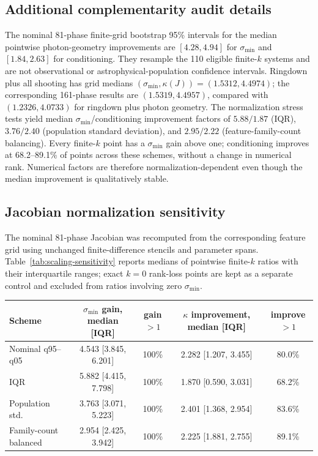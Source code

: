 \documentclass[11pt]{article}
\newcommand{\smin}{\sigma_{\min}}
\newcommand{\kappaJ}{\kappa(J)}
\begin{document}
\subsection{Additional complementarity audit details}
The nominal 81-phase finite-grid bootstrap 95\% intervals for the median
pointwise photon-geometry improvements are $[4.28,4.94]$ for $\smin$ and
$[1.84,2.63]$ for conditioning. They resample the 110 eligible finite-$k$
systems and are not observational or astrophysical-population confidence
intervals. Ringdown
plus all shooting has grid medians $(\smin,\kappaJ)=(1.5312,4.4974)$;
the corresponding 161-phase results are $(1.5319,4.4957)$, compared with
$(1.2326,4.0733)$ for ringdown plus photon geometry. The normalization
stress tests yield median $\smin$/conditioning improvement factors of
$5.88/1.87$ (IQR), $3.76/2.40$ (population standard deviation), and
$2.95/2.22$ (feature-family-count balancing). Every finite-$k$ point has a
$\smin$ gain above one; conditioning improves at 68.2--89.1\% of points
across these schemes, without a change in numerical rank. Numerical factors
are therefore normalization-dependent even though the median improvement is
qualitatively stable.

\subsection{Jacobian normalization sensitivity}
\label{app:scaling-sensitivity}
The nominal 81-phase Jacobian was recomputed from the corresponding
feature grid using unchanged finite-difference stencils and parameter spans.
Table~\ref{tab:scaling-sensitivity} reports medians of pointwise finite-$k$
ratios with their interquartile ranges; exact $k=0$ rank-loss points are kept as
a separate control and excluded from ratios involving zero $\smin$.

\begin{center}
\begin{minipage}{.96\textwidth}
\label{tab:scaling-sensitivity}
\centering
\scriptsize
\begin{tabular}{lcccc}
Scheme & $\smin$ gain, median [IQR] & gain $>1$ & $\kappa$ improvement, median [IQR] & improve $>1$ \\
\hline
Nominal q95--q05 & 4.543 [3.845, 6.201] & 100\% & 2.282 [1.207, 3.455] & 80.0\% \\
IQR & 5.882 [4.415, 7.798] & 100\% & 1.870 [0.590, 3.031] & 68.2\% \\
Population std. & 3.763 [3.071, 5.223] & 100\% & 2.401 [1.368, 2.954] & 83.6\% \\
Family-count balanced & 2.954 [2.425, 3.942] & 100\% & 2.225 [1.881, 2.755] & 89.1\% \\
\end{tabular}
\end{minipage}
\end{center}
\end{document}
